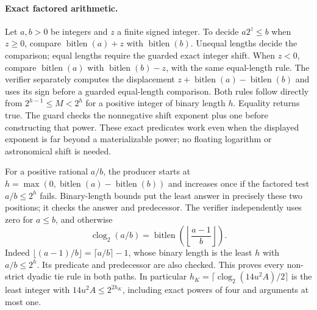 \paragraph{Exact factored arithmetic.}
Let $a,b>0$ be integers and $z$ a finite signed integer. To decide
$a2^z\le b$ when $z\ge0$, compare
$\operatorname{bitlen}(a)+z$ with $\operatorname{bitlen}(b)$.
Unequal lengths decide the comparison; equal lengths require the guarded
exact integer shift. When $z<0$, compare $\operatorname{bitlen}(a)$ with
$\operatorname{bitlen}(b)-z$, with the same equal-length rule.
The verifier separately computes the displacement
$z+\operatorname{bitlen}(a)-\operatorname{bitlen}(b)$ and uses its sign
before a guarded equal-length comparison. Both rules follow directly from
$2^{h-1}\le M<2^h$ for a positive integer of binary length $h$.
Equality returns true. The guard checks the nonnegative shift exponent plus
one before constructing that power. These exact predicates work even when
the displayed exponent is far beyond a materializable power; no floating
logarithm or astronomical shift is needed.

For a positive rational $a/b$, the producer starts at
$h=\max(0,\operatorname{bitlen}(a)-\operatorname{bitlen}(b))$ and increases
once if the factored test $a/b\le2^h$ fails. Binary-length bounds put the
least answer in precisely these two positions; it checks the answer and
predecessor. The verifier independently uses zero for $a\le b$, and otherwise
\begin{equation}\label{udc:clog}
 \operatorname{clog}_2(a/b)
 =\operatorname{bitlen}\!\left(\left\lfloor\frac{a-1}{b}\right\rfloor\right).
\end{equation}
Indeed $\lfloor(a-1)/b\rfloor=\lceil a/b\rceil-1$, whose binary length is
the least $h$ with $a/b\le2^h$. Its predicate and predecessor are also
checked. This proves every non-strict dyadic tie rule in both paths.
In particular $h_K=\lceil\operatorname{clog}_2(14u^2A)/2\rceil$ is the
least integer with $14u^2A\le2^{2h_K}$, including exact powers of four and
arguments at most one.

